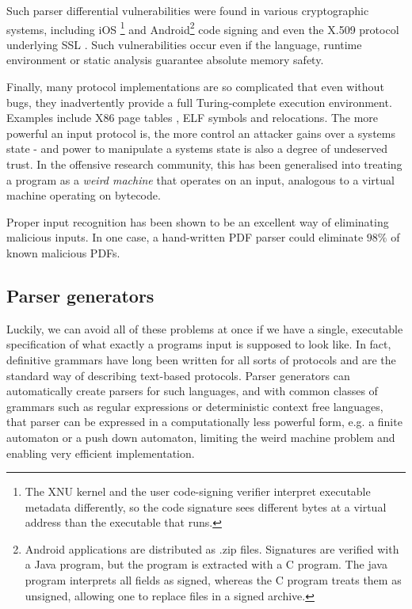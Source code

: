 Such parser differential vulnerabilities were found in various cryptographic systems, including  iOS
\footnote{The XNU kernel and the user code-signing verifier interpret executable metadata
  differently, so the code signature sees different bytes at a virtual address than the executable
  that runs.}\cite{evaders6} and Android\footnote{Android applications are distributed as .zip
  files. Signatures are verified with a Java program, but the program is extracted with a C program.
The java program interprets all fields as signed, whereas the C program treats them as unsigned,
allowing one to replace files in a signed archive.}
\cite{saurik-masterkey} code signing and even the
X.509 protocol underlying SSL \cite{DBLP:conf/fc/KaminskyPS10}. Such vulnerabilities occur even if the language,
runtime environment or static analysis guarantee absolute memory safety.

Finally, many protocol implementations are so complicated that even without bugs, they inadvertently
provide a full Turing-complete execution environment. Examples include X86 page tables
\cite{bangert2013page}, ELF symbols and relocations\cite{shapiro2013weird}.  
The more powerful an input
protocol is, the more control an attacker gains over a systems state - and power to manipulate a
systems state is also a degree of undeserved trust. In the offensive research community, this has
been generalised into treating a program as a \textit{weird machine}\cite{bratus2011exploit} that
operates on an input, analogous to a virtual machine operating on bytecode.

Proper input recognition has been shown to be an excellent way of eliminating malicious inputs. In
one case, a hand-written PDF parser could eliminate $98\%$ of known malicious PDFs\cite{Bogk-PDF}.


\subsection{Parser generators}
Luckily, we can avoid all of these problems at once if we have a single, executable specification of
what exactly a programs input is supposed to look like. In fact, definitive grammars have long
been written for all sorts of protocols and are the standard way of describing text-based protocols.
Parser generators can automatically create parsers for such languages, and with common classes of
grammars such as regular expressions or deterministic context free languages, that parser can be
expressed in a computationally less powerful form, e.g. a finite automaton or a push down automaton,
limiting the weird machine problem and enabling very efficient implementation. \cite{Knuth1965607}


